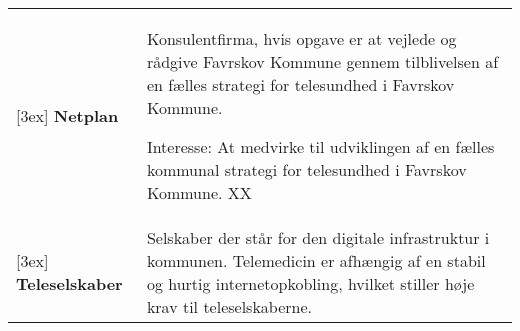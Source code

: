 \documentclass[10pt,a4paper]{article}
\begin{document}
\begin{table}[H]
\begin{tabularx}{\linewidth}{lX}
[3ex]
\textbf{Netplan} & Konsulentfirma, hvis opgave er at vejlede og rådgive Favrskov Kommune gennem tilblivelsen af en fælles strategi for telesundhed i Favrskov Kommune.

Interesse: At medvirke til udviklingen af en fælles kommunal strategi for telesundhed i Favrskov Kommune. XX\\


[3ex]
\textbf{Teleselskaber} & Selskaber der står for den digitale infrastruktur i kommunen. Telemedicin er afhængig af en stabil og hurtig internetopkobling, hvilket stiller høje krav til teleselskaberne.\\

\end{tabularx}
\end{table}
\end{document}
